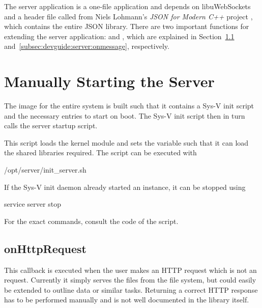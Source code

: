 The   server  application   is   a  one-file   application   and  depends   on
libuWebSockets~\cite{uws:github} and a header file called  from
Niels Lohmann's \emph{JSON for Modern C++} project \cite{lohmann:github:json},
which contains the entire JSON library.  There are two important functions for
extending the  server application:   and ,
which  are   explained  in  Section~\ref{subsec:devguide:server:onhttprequest}
and~\ref{subsec:devguide:server:onmessage}, respectively.

\section{Manually Starting the Server} %
\label{sec:devguide:server:build}

The image for  the entire system is  built such that it contains  a Sys-V init
script and the necessary entries to start on boot.  The Sys-V init script then
in turn calls the server startup script.

This  script loads  the kernel  module and  sets the  
variable such that  it can load the shared libraries  required. The script can
be executed with
\begin{commandshell}
    /opt/server/init_server.sh
\end{commandshell}
If the Sys-V init daemon already started an instance, it can be stopped using
\begin{commandshell}
    service server stop
\end{commandshell}
For the exact commands, consult the code of the  script.

\subsection{onHttpRequest} %
\label{subsec:devguide:server:onhttprequest}

This callback is executed when the user  makes an HTTP request which is not an
 request. Currently  it simply  serves the  files from  the file
system,  but could  easily  be  extended to  outline  data  or similar  tasks.
Returning a correct HTTP response has to be performed manually and is not well
documented in the library itself.

